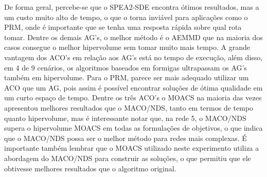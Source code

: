 De forma geral, percebe-se que o SPEA2-SDE encontra ótimos resultados, mas a um custo muito alto de tempo, o que o torna inviável para aplicações como o PRM, onde é importante que se tenha uma resposta rápida sobre qual rota tomar. Dentre os demais AG's, o melhor método é o AEMMD que na maioria dos casos consegue o melhor hipervolume sem tomar muito mais tempo. A grande vantagem dos ACO's em relação aos AG's está no tempo de execução, além disso, em 4 de 9 cenários, os algoritmos baseados em formigas ultrapassam os AG's também em hipervolume. Para o PRM, parece ser mais adequado utilizar um ACO que um AG, pois assim é possível encontrar soluções de ótima qualidade em um curto espaço de tempo. Dentre os três ACO's o MOACS na maioria das vezes apresentou melhores resultados que o MACO/NDS, tanto em termos de tempo quanto hipervolume, mas é interessante notar que, na rede 5, o MACO/NDS supera o hipervolume MOACS em todas as formulações de objetivos, o que indica que o MACO/NDS possa ser o melhor método para redes mais complexas. É importante também lembrar que o MOACS utilizado neste experimento utiliza a abordagem do MACO/NDS para construir as soluções, o que permitiu que ele obtivesse melhores resultados que o algoritmo original.